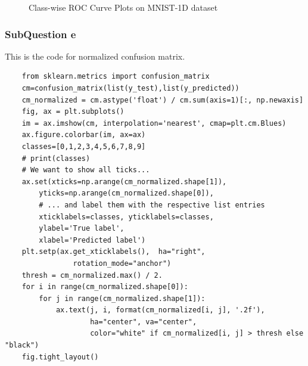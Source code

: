 \documentclass[conference]{IEEEtran}
\begin{document}
\begin{figure}[h]

\caption{Class-wise ROC Curve Plots on MNIST-1D dataset}
\label{Fig.ba}
\end{figure}

\subsubsection{SubQuestion e}
This is the code for normalized confusion matrix.
\begin{lstlisting}
    from sklearn.metrics import confusion_matrix
    cm=confusion_matrix(list(y_test),list(y_predicted))
    cm_normalized = cm.astype('float') / cm.sum(axis=1)[:, np.newaxis]
    fig, ax = plt.subplots()
    im = ax.imshow(cm, interpolation='nearest', cmap=plt.cm.Blues)
    ax.figure.colorbar(im, ax=ax)
    classes=[0,1,2,3,4,5,6,7,8,9]
    # print(classes)
    # We want to show all ticks...
    ax.set(xticks=np.arange(cm_normalized.shape[1]),
        yticks=np.arange(cm_normalized.shape[0]),
        # ... and label them with the respective list entries
        xticklabels=classes, yticklabels=classes,
        ylabel='True label',
        xlabel='Predicted label')
    plt.setp(ax.get_xticklabels(),  ha="right",
                rotation_mode="anchor")
    thresh = cm_normalized.max() / 2.
    for i in range(cm_normalized.shape[0]):
        for j in range(cm_normalized.shape[1]):
            ax.text(j, i, format(cm_normalized[i, j], '.2f'),
                    ha="center", va="center",
                    color="white" if cm_normalized[i, j] > thresh else "black")
    fig.tight_layout()
\end{lstlisting}
\end{document}
